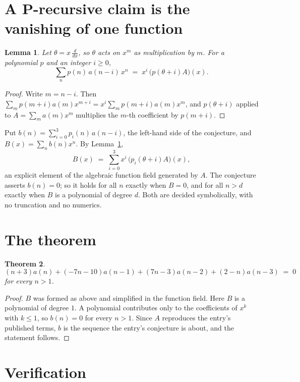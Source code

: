 \documentclass[11pt,a4paper]{article}
\theoremstyle{plain}
\newtheorem{theorem}{Theorem}
\newtheorem{lemma}[theorem]{Lemma}
\theoremstyle{definition}
\begin{document}
\section{A P-recursive claim is the vanishing of one function}

\begin{lemma}\label{lem:theta}
Let $\theta=x\,\frac{d}{dx}$, so $\theta$ acts on $x^m$ as multiplication by $m$. For a
polynomial $p$ and an integer $i\ge0$,
\[
\sum_{n} p(n)\,a(n-i)\,x^{n}\;=\;x^{i}\,\bigl(p(\theta+i)A\bigr)(x).
\]
\end{lemma}

\begin{proof}
Write $m=n-i$. Then $\sum_m p(m+i)a(m)x^{m+i}=x^i\sum_m p(m+i)a(m)x^m$, and $p(\theta+i)$
applied to $A=\sum_m a(m)x^m$ multiplies the $m$-th coefficient by $p(m+i)$.
\end{proof}

Put $b(n)=\sum_{i=0}^{3}p_i(n)\,a(n-i)$, the left-hand side of the conjecture, and
$B(x)=\sum_n b(n)x^n$. By Lemma~\ref{lem:theta},
\[
B(x)\;=\;\sum_{i=0}^{3}x^{i}\,\bigl(p_i(\theta+i)A\bigr)(x),
\]
an explicit element of the algebraic function field generated by $A$. The conjecture asserts
$b(n)=0$; so it holds for all $n$ exactly when $B=0$, and for all $n>d$ exactly when $B$ is a
polynomial of degree $d$. Both are decided symbolically, with no truncation and no numerics.

\section{The theorem}

\begin{theorem}
\[
\left(n + 3\right)a(n) + \left(- 7 n - 10\right)a(n-1) + \left(7 n - 3\right)a(n-2) + \left(2 - n\right)a(n-3)\;=\;0
\]
for every $n>1$.
\end{theorem}

\begin{proof}
$B$ was formed as above and simplified in the function field. Here $B$ is a polynomial of degree $1$. A polynomial contributes only to the coefficients of $x^k$ with $k\le1$, so $b(n)=0$ for every $n>1$. Since $A$ reproduces the
entry's published terms, $b$ is the sequence the entry's conjecture is about, and the statement
follows.
\end{proof}

\section{Verification}
\end{document}
